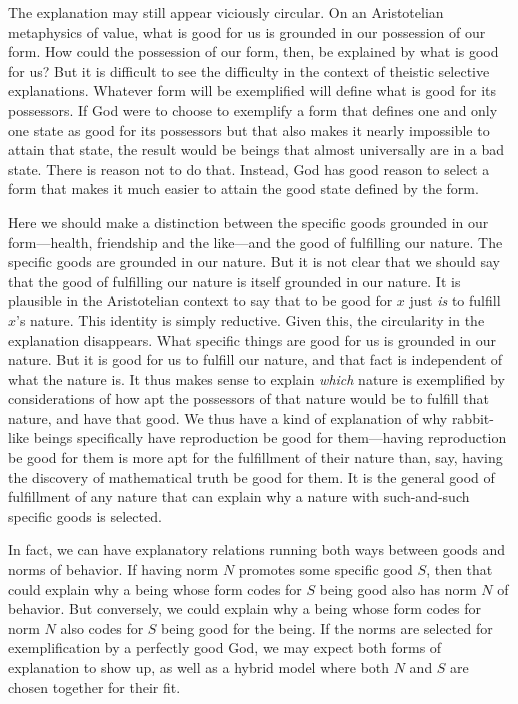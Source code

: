 The explanation may still appear viciously circular. On an Aristotelian metaphysics of value, what is good for us
is grounded in our possession of our form. How could the possession of our form, then, be explained by what is good 
for us? But it is difficult to see the difficulty in the context of theistic selective explanations. Whatever 
form will be exemplified will define what is good for its possessors. If God were to choose to exemplify a form
that defines one and only one state as good for its possessors but that also makes it nearly impossible to attain
that state, the result would be beings that almost universally are in a bad state. There is reason not to do that.
Instead, God has good reason to select a form that makes it much easier to attain the good state defined by the form.

Here we should make a distinction between the specific goods grounded in our form---health, friendship and the like---and
the good of fulfilling our nature. The specific goods are grounded in our nature. But it is not clear that we should say that 
the good of fulfilling our nature is itself grounded in our nature. It is plausible in the Aristotelian context to say that 
to be good for $x$ just \textit{is} to fulfill $x$'s nature. This identity is simply reductive. Given this, the circularity
in the explanation disappears. What specific things are good for us is grounded in our nature. But it is good for us to fulfill
our nature, and that fact is independent of what the nature is. It thus makes sense to explain \textit{which} nature is 
exemplified by considerations of how apt the possessors of that nature would be to fulfill that nature, and have that good.
We thus have a kind of explanation of why rabbit-like beings specifically have reproduction be good for them---having reproduction
be good for them is more apt for the fulfillment of their nature than, say, having the discovery of mathematical truth be good
for them. It is the general good of fulfillment of any nature that can explain why a nature with such-and-such specific goods is
selected.

In fact, we can have explanatory relations running both ways between goods and norms of behavior. If having norm $N$ promotes
some specific good $S$, then that could explain why a being whose form codes for $S$ being good also has norm $N$ of behavior.
But conversely, we could explain why a being whose form codes for norm $N$ also codes for $S$ being good for the being. 
If the norms are selected for exemplification by a perfectly good God, we may expect both forms of explanation to show up,
as well as a hybrid model where both $N$ and $S$ are chosen together for their fit.

